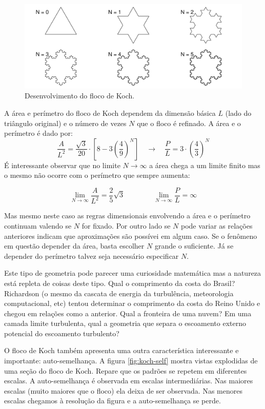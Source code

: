 \documentclass[article,12pt,oneside,a4paper,english,brazil,sumario=tradicional]{abntex2}
\newcommand{\lra}{\ensuremath{\longrightarrow}}
\newcommand{\qrq}{\ensuremath{\quad\lra\quad}}
\begin{document}
\begin{figure}
\centering
\includegraphics[width=\textwidth]{./figuras/koch.pdf}
\caption{Desenvolvimento do floco de Koch.}
\label{fig:koch}
\end{figure}

A área e perímetro do floco de Koch dependem da dimensão básica $L$ (lado do triângulo original) e o número de vezes $N$ que o floco é refinado. A área e o perímetro é dado por:
\[
\frac{A}{L^2} = \frac{\sqrt{3}}{20} \cdot \left[8 - 3\left(\frac{4}{9}\right)^N\right] \qrq \frac{P}{L} = 3\cdot\left(\frac{4}{3}\right)^N
\]
É interessante observar que no limite $N\lra\infty$ a área chega a um limite finito mas o mesmo não ocorre com o perímetro que sempre aumenta:

\[
\lim_{N\lra\infty} \frac{A}{L^2} = \frac{2}{5}\sqrt{3} \qquad\qquad \lim_{N\lra\infty}\frac{P}{L} = \infty
\]

Mas mesmo neste caso as regras dimensionais envolvendo a área e o perímetro continuam valendo se $N$ for fixado. Por outro lado se $N$ pode variar as relações anteriores indicam que aproximações são possívei em algum caso. Se o fenômeno em questão depender da área, basta escolher $N$ grande o suficiente. Já se depender do perímetro talvez seja necessário especificar $N$.

Este tipo de geometria pode parecer uma curiosidade matemática mas a natureza está repleta de coisas deste tipo. Qual o comprimento da costa do Brasil? Richardson (o mesmo da cascata de energia da turbulência, meteorologia computacional, etc) tentou determinar o comprimento da costa do Reino Unido e chegou em relações como a anterior. Qual a fronteira de uma nuvem? Em uma camada limite turbulenta, qual a geometria que separa o escoamento externo potencial do escoamento turbulento?

O floco de Koch também apresenta uma outra característica interessante e importante: auto-semelhança. A figura \ref{fig:koch-self} mostra vistas explodidas de uma seção do floco de Koch. Repare que os padrões se repetem em diferentes escalas. A auto-semelhança é observada em escalas intermediárias. Nas maiores escalas (muito maiores que o floco) ela deixa de ser observada. Nas menores escalas chegamos à resolução da figura e a auto-semelhança se perde. 
\end{document}
